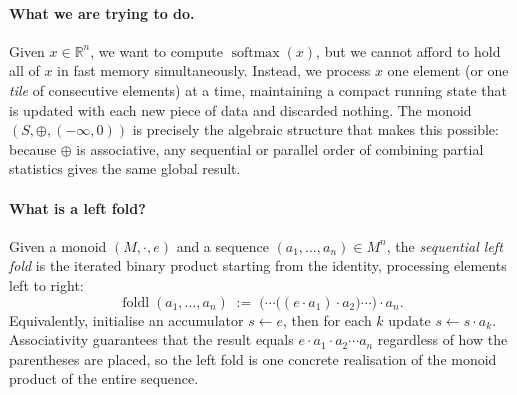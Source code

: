 \documentclass[11pt]{amsart}
\theoremstyle{plain}
\theoremstyle{definition}
\newcommand{\R}{\mathbb{R}}
\newcommand{\softmax}{\operatorname{softmax}}
\begin{document}
\paragraph{What we are trying to do.}
Given $x \in \R^n$, we want to compute $\softmax(x)$, but we cannot afford to
hold all of $x$ in fast memory simultaneously.  Instead, we process $x$ one
element (or one \emph{tile} of consecutive elements) at a time, maintaining a
compact running state that is updated with each new piece of data and discarded
nothing.  The monoid $(S,\oplus,(-\infty,0))$ is precisely the algebraic
structure that makes this possible: because $\oplus$ is associative, any
sequential or parallel order of combining partial statistics gives the same
global result.

\paragraph{What is a left fold?}
Given a monoid $(M, \cdot, e)$ and a sequence $(a_1, \ldots, a_n) \in M^n$,
the \emph{sequential left fold} is the iterated binary product starting from
the identity, processing elements left to right:
\[
    \operatorname{foldl}(a_1,\ldots,a_n)
    \;:=\;
    \bigl(\cdots\bigl((e \cdot a_1) \cdot a_2\bigr) \cdots\bigr) \cdot a_n.
\]
Equivalently, initialise an accumulator $s \leftarrow e$, then for each $k$
update $s \leftarrow s \cdot a_k$.  Associativity guarantees that the result
equals $e \cdot a_1 \cdot a_2 \cdots a_n$ regardless of how the parentheses
are placed, so the left fold is one concrete realisation of the monoid product
of the entire sequence.
\end{document}

